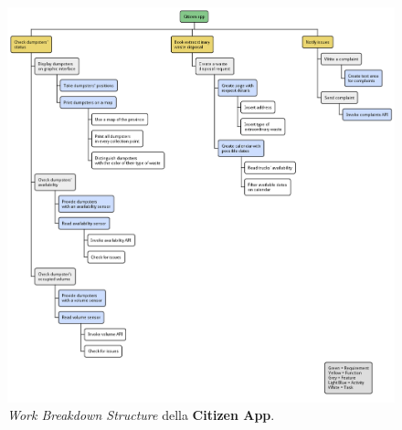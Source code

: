 \begin{figure}[H]
    \centering
    \includegraphics[width=\textwidth]{uml/wbs-citizen-app.pm}
    \caption{\textit{Work Breakdown Structure} della \textbf{Citizen App}.}
    \label{fig:uml/wbs-citizen-app}
\end{figure}

